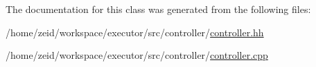 The documentation for this class was generated from the following files:\begin{DoxyCompactItemize}
\item 
/home/zeid/workspace/executor/src/controller/\hyperlink{controller_8hh}{controller.hh}\item 
/home/zeid/workspace/executor/src/controller/\hyperlink{controller_8cpp}{controller.cpp}\end{DoxyCompactItemize}
